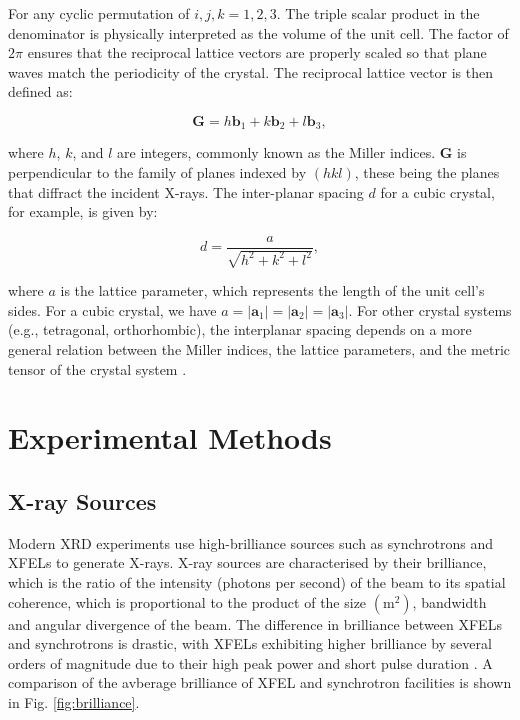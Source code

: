 \documentclass[aps,prb,twocolumn,superscriptaddress]{revtex4-2}
\begin{document}
For any cyclic permutation of ${i,j,k} = {1, 2, 3}$. The triple scalar product
in the denominator is physically interpreted as the volume of the unit cell. The
factor of $2\pi$ ensures that the reciprocal lattice vectors are properly scaled
so that plane waves match the periodicity of the crystal. The reciprocal lattice
vector is then defined as:

\begin{equation}\label{eq:reciprocal_vector}
    \mathbf{G} = h\mathbf{b}_1 + k\mathbf{b}_2 + l\mathbf{b}_3,
\end{equation}

where $h$, $k$, and $l$ are integers, commonly known as the Miller indices.
$\mathbf{G}$ is perpendicular to the family of planes indexed by $(hkl)$, these
being the planes that diffract the incident X-rays.  The inter-planar
spacing $d$ for a cubic crystal, for example,
is given by:

\begin{equation}\label{eq:interplanar}
    d = \frac{a}{\sqrt{h^2 + k^2 + l^2}},
\end{equation}

where $a$ is the lattice parameter, which represents the length of the unit
cell's sides.  For a cubic crystal, we have $a = |\textbf{a}_1| = |\textbf{a}_2|
= |\textbf{a}_3|$.  For other crystal systems (e.g., tetragonal, orthorhombic),
the interplanar spacing depends on a more general relation between the Miller
indices, the lattice parameters, and the metric tensor of the crystal system
\cite{Liu2020}.





\section{Experimental Methods} \label{sec:experiment}
\subsection{X-ray Sources}
Modern XRD experiments use high-brilliance sources such as synchrotrons and
XFELs to generate X-rays. X-ray sources are characterised by their brilliance,
which is the ratio of the intensity (photons per second) of the beam to its
spatial coherence, which is proportional to the product of the size
$(\text{m}^2)$, bandwidth and angular divergence of the beam.  The difference in
brilliance between XFELs and synchrotrons is drastic, with XFELs exhibiting
higher brilliance by several orders of magnitude due to their high peak power
and short pulse duration \cite{Baillet2014}. A comparison of the avberage
brilliance of XFEL and synchrotron facilities is shown in Fig.
\ref{fig:brilliance}.
\end{document}
